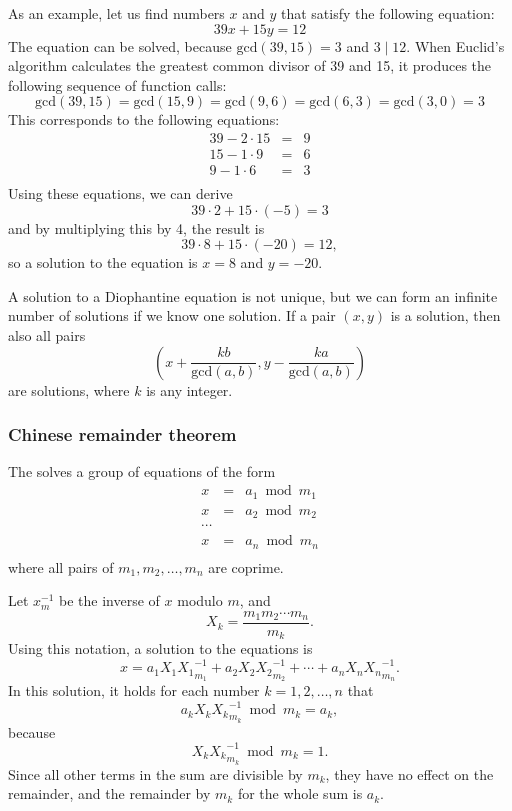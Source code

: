 As an example, let us find numbers $x$ and $y$
that satisfy the following equation:
\[
39x + 15y = 12
\]
The equation can be solved, because
$\textrm{gcd}(39,15)=3$ and $3 \mid 12$.
When Euclid's algorithm calculates the
greatest common divisor of 39 and 15,
it produces the following sequence of function calls:
\[
\textrm{gcd}(39,15) = \textrm{gcd}(15,9)
= \textrm{gcd}(9,6) = \textrm{gcd}(6,3)
= \textrm{gcd}(3,0) = 3 \]
This corresponds to the following equations:
\[
\begin{array}{lcl}
39 - 2 \cdot 15 & = & 9 \\
15 - 1 \cdot 9 & = & 6 \\
9 - 1 \cdot 6 & = & 3 \\
\end{array}
\]
Using these equations, we can derive
\[
39 \cdot 2 + 15 \cdot (-5) = 3
\]
and by multiplying this by 4, the result is
\[
39 \cdot 8 + 15 \cdot (-20) = 12,
\]
so a solution to the equation is
$x=8$ and $y=-20$.

A solution to a Diophantine equation is not unique,
but we can form an infinite number of solutions
if we know one solution.
If a pair $(x,y)$ is a solution, then also all pairs
\[(x+\frac{kb}{\textrm{gcd}(a,b)},y-\frac{ka}{\textrm{gcd}(a,b)})\]
are solutions, where $k$ is any integer.

\subsubsection{Chinese remainder theorem}


The  solves
a group of equations of the form
\[
\begin{array}{lcl}
x & = & a_1 \bmod m_1 \\
x & = & a_2 \bmod m_2 \\
\cdots \\
x & = & a_n \bmod m_n \\
\end{array}
\]
where all pairs of $m_1,m_2,\ldots,m_n$ are coprime.

Let $x^{-1}_m$ be the inverse of $x$ modulo $m$, and
\[ X_k = \frac{m_1 m_2 \cdots m_n}{m_k}.\]
Using this notation, a solution to the equations is
\[x = a_1 X_1 {X_1}^{-1}_{m_1} + a_2 X_2 {X_2}^{-1}_{m_2} + \cdots + a_n X_n {X_n}^{-1}_{m_n}.\]
In this solution, it holds for each number
$k=1,2,\ldots,n$ that
\[a_k X_k {X_k}^{-1}_{m_k} \bmod m_k = a_k,\]
because
\[X_k {X_k}^{-1}_{m_k} \bmod m_k = 1.\]
Since all other terms in the sum are divisible by $m_k$,
they have no effect on the remainder,
and the remainder by $m_k$ for the whole sum is $a_k$.

